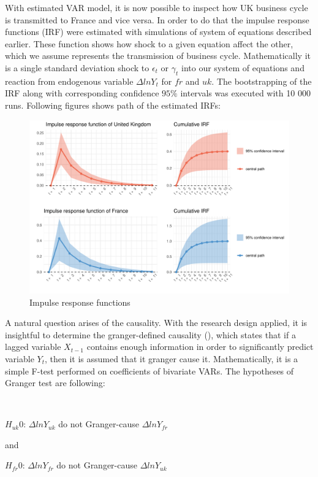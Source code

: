 \documentclass{article}
\begin{document}
With estimated VAR model, it is now possible to inspect how UK business cycle is transmitted to France and vice versa. In order to do that the impulse response functions (IRF) were estimated with simulations of system of equations described earlier. These function shows how shock to a given equation affect the other, which we assume represents the transmission of business cycle. Mathematically it is a single standard deviation shock to $\epsilon_t$ or $\gamma_t$ into our system of equations and reaction from endogenous variable $\Delta ln Y_{t}$ for $fr$ and $uk$. The bootstrapping of the IRF along with corresponding confidence $95\%$ intervals was executed with 10 000 runs. Following figures shows path of the estimated IRFs:

\begin{figure}[!ht]
\centering
\includegraphics[scale=0.6]{graphs/irf_plot.pdf}
\caption{Impulse response functions}
\end{figure}

A natural question arises of the causality. With the research design applied, it is insightful to determine the granger-defined causality (\cite{granger}), which states that if a lagged variable $X_{t-1}$ contains enough information in order to significantly predict variable $Y_t$, then it is assumed that it granger cause it. Mathematically, it is a simple F-test performed on coefficients of bivariate VARs. The hypotheses of Granger test are following:

\

$H_{uk}0$: $\Delta ln Y_{uk}$ do not Granger-cause $\Delta ln Y_{fr}$

and

$H_{fr}0$: $\Delta ln Y_{fr}$ do not Granger-cause $\Delta ln Y_{uk}$
\end{document}
